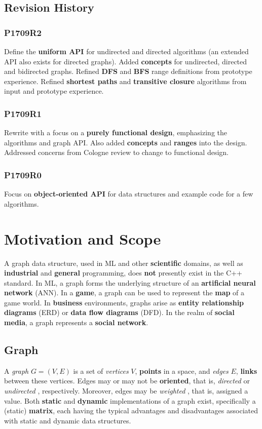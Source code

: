 \documentclass[10pt,onecolumn]{article}
\begin{document}
\subsection{Revision History}
\subsubsection*{P1709R2}
Define the \textbf{uniform API} for undirected and directed algorithms (an extended API also exists for directed graphs). Added \textbf{concepts} for undirected, directed and bidirected graphs. Refined \textbf{DFS} and \textbf{BFS} range definitions from prototype experience. Refined \textbf{shortest paths} and \textbf{transitive closure} algorithms from input and prototype experience.

\subsubsection*{P1709R1}
Rewrite with a focus on a \textbf{purely functional design}, emphasizing the algorithms and graph API. Also added \textbf{concepts} and \textbf{ranges} into the design. Addressed concerns from Cologne review to change to functional design.

\subsubsection*{P1709R0}
Focus on \textbf{object-oriented API} for data structures and example code for a few algorithms.

\section{Motivation and Scope}
A graph data structure, used in ML and other \textbf{scientific} domains, as well as \textbf{industrial} and \textbf{general} programming, does \textbf{not} presently exist in the C++ standard. In ML, a graph forms the underlying structure of an \textbf{artificial neural network} (ANN). In a \textbf{game}, a graph can be used to
represent the \textbf{map} of a game world. In \textbf{business} environments, graphs arise as \textbf{entity relationship diagrams} (ERD) or \textbf{data flow diagrams} (DFD). In the realm of \textbf{social media}, a graph represents a \textbf{social network}.

\subsection{Graph}
 A \textit{graph} \cite{REF_graph} $G = (V, E)$ is a set of \textit{vertices} \cite{REF_graph} $V$, \textbf{points} in a space, and \textit{edges} \cite{REF_graph} $E$, \textbf{links} between these vertices. Edges may or may not be \textbf{oriented}, that is, \textit{directed} \cite{REF_graph} or \textit{undirected} \cite{REF_graph}, respectively. Moreover, edges may be \textit{weighted} \cite{REF_graph}, that is, assigned a value. Both \textbf{static} and \textbf{dynamic} implementations of a graph exist, specifically a (static) \textbf{matrix}, each having the typical advantages and disadvantages associated with static and dynamic data structures.
\end{document}
